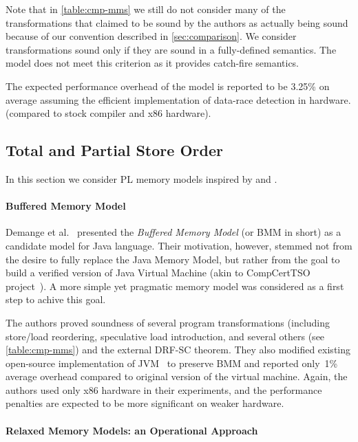 Note that in \cref{table:cmp-mms} we still do not consider 
many of the transformations that claimed to be sound by the authors
as actually being sound because of our convention described in \cref{sec:comparison}.
We consider transformations sound only if they are 
sound in a fully-defined semantics. 
The \DRFx model does not meet this criterion as 
it provides catch-fire semantics.

The expected performance overhead of the model 
is reported to be 3.25\% on average
assuming the efficient implementation 
of data-race detection in hardware. 
(compared to stock compiler and x86 hardware). 

\subsection{Total and Partial Store Order}

In this section we consider PL memory models 
inspired by \TSO and \PSO.  

\paragraph{Buffered Memory Model}

Demange et al.~\cite{Demange-al:POPL13} presented 
the \emph{Buffered Memory Model} (or BMM in short)
as a candidate model for Java language.
Their motivation, however, stemmed not from the desire 
to fully replace the Java Memory Model, but rather 
from the goal to build a verified version of 
Java Virtual Machine (akin to CompCertTSO project~\cite{Sevcik-al:JACM13}).
A more simple yet pragmatic memory \TSO model 
was considered as a first step to achive this goal. 

The authors proved soundness of several program transformations
(including store/load reordering, speculative load introduction,
and several others (see \cref{table:cmp-mms})
and the external DRF-SC theorem. 
They also modified existing open-source implementation of 
JVM~\cite{Pizlo-al:ECCS10} to preserve BMM and 
reported only~1\% average overhead 
compared to original version of the virtual machine. 
Again, the authors used only x86 hardware in their 
experiments, and the performance penalties 
are expected to be more significant on weaker hardware.   

\paragraph{Relaxed Memory Models: an Operational Approach}

